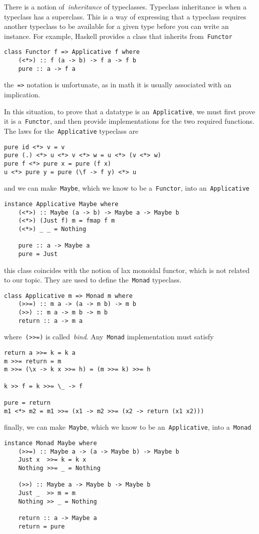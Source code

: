\documentclass[../TFG.tex]{subfiles}
\begin{document}
There is a notion of~\emph{inheritance} of typeclasses. Typeclass inheritance is
when a typeclass has a superclass. This is a way of expressing that a typeclass
requires another typeclass to be available for a given type before you can write
an instance. For example, Haskell provides a class that inherits
from~\texttt{Functor}
\begin{verbatim}
class Functor f => Applicative f where
    (<*>) :: f (a -> b) -> f a -> f b
    pure :: a -> f a
\end{verbatim}
the~\texttt{=>} notation is unfortunate, as in math it is usually
associated with an implication.

In this situation, to prove that a datatype is
an~\texttt{Applicative}, we must first prove it is
a~\texttt{Functor}, and then provide implementations for the two
required functions.
The laws for the~\texttt{Applicative} typeclass are
\begin{verbatim}
pure id <*> v = v
pure (.) <*> u <*> v <*> w = u <*> (v <*> w)
pure f <*> pure x = pure (f x)
u <*> pure y = pure (\f -> f y) <*> u
\end{verbatim}
and we can make~\texttt{Maybe}, which we know to be
a~\texttt{Functor}, into an~\texttt{Applicative}
\begin{verbatim}
instance Applicative Maybe where
    (<*>) :: Maybe (a -> b) -> Maybe a -> Maybe b
    (<*>) (Just f) m = fmap f m
    (<*>) _ _ = Nothing

    pure :: a -> Maybe a
    pure = Just
\end{verbatim}
this class coincides with the notion of lax monoidal functor, which is not
related to our topic. They are used to define the~\texttt{Monad}
typeclass.

\begin{verbatim}
class Applicative m => Monad m where
    (>>=) :: m a -> (a -> m b) -> m b
    (>>) :: m a -> m b -> m b
    return :: a -> m a
\end{verbatim}
where~\texttt{(>>=)} is called~\emph{bind}.
Any~\texttt{Monad} implementation must satisfy
\begin{verbatim}
return a >>= k = k a
m >>= return = m
m >>= (\x -> k x >>= h) = (m >>= k) >>= h

k >> f = k >>= \_ -> f

pure = return
m1 <*> m2 = m1 >>= (x1 -> m2 >>= (x2 -> return (x1 x2)))
\end{verbatim}
finally, we can make~\texttt{Maybe}, which we know to be
an~\texttt{Applicative}, into a~\texttt{Monad}
\begin{verbatim}
instance Monad Maybe where
    (>>=) :: Maybe a -> (a -> Maybe b) -> Maybe b
    Just x  >>= k = k x
    Nothing >>= _ = Nothing

    (>>) :: Maybe a -> Maybe b -> Maybe b
    Just _  >> m = m
    Nothing >> _ = Nothing

    return :: a -> Maybe a
    return = pure
\end{verbatim}
\end{document}
